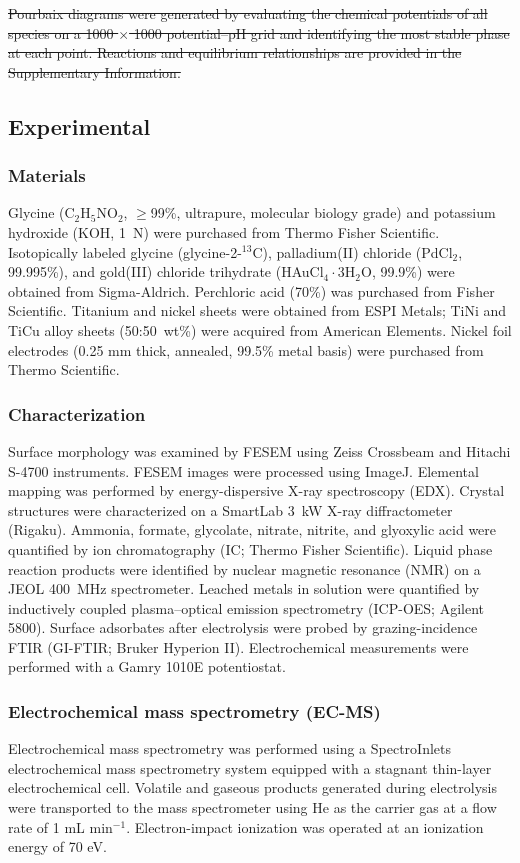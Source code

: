\documentclass[twoside,twocolumn,9pt]{article}
\begin{document}
\sout{Pourbaix diagrams were generated by evaluating the chemical potentials of all species on a 1000 $\times$ 1000 potential–pH grid and identifying the most stable phase at each point. Reactions and equilibrium relationships are provided in the Supplementary Information.}

\subsection{Experimental}
\subsubsection{Materials}
Glycine (C$_2$H$_5$NO$_2$, $\geq$99\%, ultrapure, molecular biology grade) and potassium hydroxide (KOH, 1~N) were purchased from Thermo Fisher Scientific. Isotopically labeled glycine (glycine-2-$^{13}$C), palladium(II) chloride (PdCl$_2$, 99.995\%), and gold(III) chloride trihydrate (HAuCl$_4\cdot$3H$_2$O, 99.9\%) were obtained from Sigma-Aldrich. Perchloric acid (70\%) was purchased from Fisher Scientific. Titanium and nickel sheets were obtained from ESPI Metals; TiNi and TiCu alloy sheets (50:50~wt\%) were acquired from American Elements. Nickel foil electrodes (0.25 mm thick, annealed, 99.5\% metal basis) were purchased from Thermo Scientific.

\subsubsection{Characterization}
Surface morphology was examined by FESEM using Zeiss Crossbeam and Hitachi S-4700 instruments. FESEM images were processed using ImageJ. Elemental mapping was performed by energy-dispersive X-ray spectroscopy (EDX). Crystal structures were characterized on a SmartLab 3~kW X-ray diffractometer (Rigaku). Ammonia, formate, glycolate, nitrate, nitrite, and glyoxylic acid were quantified by ion chromatography (IC; Thermo Fisher Scientific). Liquid phase reaction products were identified by nuclear magnetic resonance (NMR) on a JEOL 400~MHz spectrometer. Leached metals in solution were quantified by inductively coupled plasma–optical emission spectrometry (ICP-OES; Agilent 5800). Surface adsorbates after electrolysis were probed by grazing-incidence FTIR (GI-FTIR; Bruker Hyperion II). Electrochemical measurements were performed with a Gamry 1010E potentiostat.

\subsubsection{Electrochemical mass spectrometry (EC-MS)}
Electrochemical mass spectrometry was performed using a SpectroInlets electrochemical mass spectrometry system equipped with a stagnant thin-layer electrochemical cell. Volatile and gaseous products generated during electrolysis were transported to the mass spectrometer using He as the carrier gas at a flow rate of 1 mL min$^{-1}$. Electron-impact ionization was operated at an ionization energy of 70 eV. 
\end{document}
